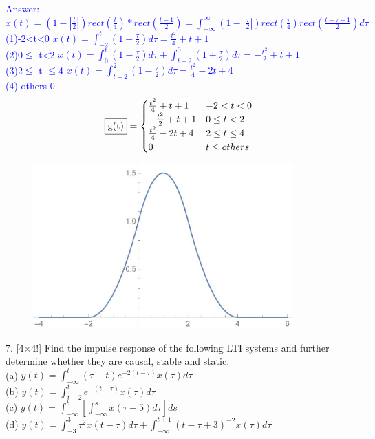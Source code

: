 \documentclass[12pt,a4paper]{article}
\begin{document}
\begin{tcolorbox}
\normalsize
\textcolor{blue}{Answer:\\
$x(t)=(1-|\frac{t}{2}|)rect(\frac{t}{4})*rect(\frac{t-1}{2})=\int_{-\infty}^\infty (1-|\frac{\tau}{2}|)rect(\frac{\tau}{4})rect(\frac{t-\tau-1}{2})d\tau$\\
(1)-2<t<0 $x(t)=\int_{-2}^t(1+\frac{\tau}{2})d\tau=\frac{t^2}{4}+t+1$\\
(2)0$\leq$ t<2 $x(t)=\int_0^t(1-\frac{\tau}{2})d\tau+\int_{t-2}^0(1+\frac{\tau}{2})d\tau=-\frac{t^2}{2}+t+1$\\
(3)2$\leq$ t $\leq$4 $x(t)=\int_{t-2}^2(1-\frac{\tau}{2})d\tau=\frac{t^2}{4}-2t+4$\\
(4) others 0
$$\fbox{g(t)}=
\begin{cases}
    \frac{t^2}{4}+t+1 & -2<t<0 \\
    -\frac{t^2}{2}+t+1 & 0\leq t<2 \\
    \frac{t^2}{4}-2t+4 & 2\leq t \leq4 \\
    0 & t\leq others
\end{cases}$$
\begin{figure}[H]
    \centering
    \includegraphics[width=10cm]{6b.jpg}
\end{figure}
}
\end{tcolorbox}
\newpage
\begin{tcolorbox}[colback = white]

7. [4$\times$4!] Find the impulse response of the following LTI systems and further determine whether they are causal, stable and static.\\
(a) $y(t)=\int_{-\infty}^{t}(\tau-t) e^{-2(t-\tau)} x(\tau) d \tau$\\
(b) $y(t)=\int_{t-2}^{t} e^{-(t-\tau)} x(\tau) d \tau$\\
(c) $y(t)=\int_{-\infty}^{t}\left[\int_{-\infty}^{s} x(\tau-5) d \tau\right] d s$\\
(d) $y(t)=\int_{-3}^{3} \tau^{2} x(t-\tau) d \tau+\int_{-\infty}^{t+1}(t-\tau+3)^{-2} x(\tau) d \tau$
\end{tcolorbox}
\end{document}
